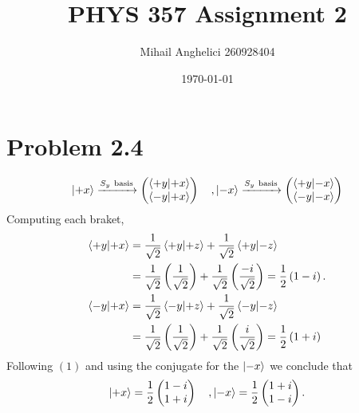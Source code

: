 \documentclass[
	12pt,
	]{article}
\title{PHYS 357 Assignment 2}
\author{Mihail Anghelici 260928404 }
\date{\today}
\theoremstyle{definition}
\theoremstyle{definition}
\theoremstyle{definition}
\theoremstyle{definition}
\theoremstyle{definition}
\theoremstyle{example}
\theoremstyle{note}
\theoremstyle{remark}
\theoremstyle{example}
\begin{document}
	\maketitle
		\section*{Problem 2.4}
			\begin{equation} \ket{+x} \xrightarrow{S_{y} \ \text{basis}} \begin{pmatrix}
				\braket{+y}{+x} \\ \braket{-y}{+x}
			\end{pmatrix} \quad, \ket{-x} \xrightarrow{S_{y} \ \text{basis}} \begin{pmatrix}
			\braket{+y}{-x} \\ \braket{-y}{-x}
			\end{pmatrix} 
			\end{equation}
			Computing each braket, 
			\begin{align*}
				\braket{+y}{+x} &= \frac{1}{\sqrt{2}} \braket{+y}{+z} + \frac{1}{\sqrt{2}} \braket{+y}{-z} \\
				&= \frac{1}{\sqrt{2}}\left(\frac{1}{\sqrt{2}}\right) + \frac{1}{\sqrt{2}}\left(\frac{-i}{\sqrt{2}} \right) = \frac12 \left(1-i\right).\\
				\braket{-y}{+x} &=\frac{1}{\sqrt{2}} \braket{-y}{+z} + \frac{1}{\sqrt{2}} \braket{-y}{-z} \\
				&= \frac{1}{\sqrt{2}} \left(\frac{1}{\sqrt{2} }\right) + \frac{1}{\sqrt{2}} \left(\frac{i}{\sqrt{2}}\right) = \frac12 \left(1+i\right)
			\end{align*}	
			Following $(1)$ and using the conjugate for the $\ket{-x}$ we conclude that
			$$ \ket{+x} = \frac12 \begin{pmatrix}
				1-i \\ 1+i
			\end{pmatrix} \quad, \ket{-x} = \frac12 \begin{pmatrix}
				1+i \\ 1-i
			\end{pmatrix}.$$
\end{document}
